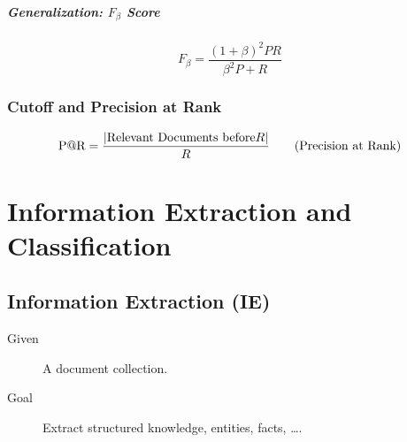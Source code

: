             \paragraph{Generalization: \( F _ \beta \) Score}
            	\begin{equation*}
                	F _ \beta = \frac{(1 + \beta)^2 P R}{\beta^2 P + R}
            	\end{equation*}

        \subsection{Cutoff and Precision at Rank} %
            \begin{equation*}
                \text{P@R} = \frac{\abs{\text{Relevant Documents before} R}}{R} \tag{Precision at Rank}
            \end{equation*}

\chapter{Information Extraction and Classification} %
    \section{Information Extraction (IE)} %
        \begin{description}
        	\item[Given] A document collection.
        	\item[Goal] Extract structured knowledge, entities, facts, \dots.
        \end{description}

